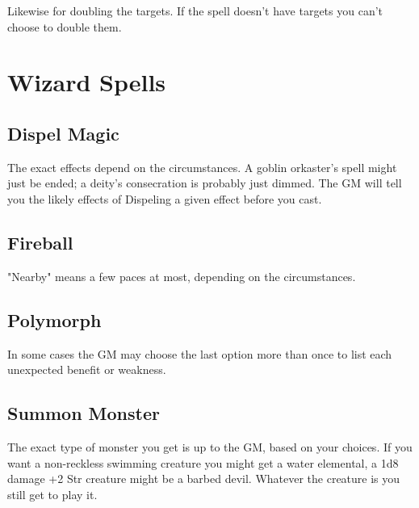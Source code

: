        

Likewise for doubling the targets. If the spell doesn't have targets you can't choose to double them.

       
\section{Wizard Spells}    
       
\subsection{Dispel Magic}    
       

The exact effects depend on the circumstances. A goblin orkaster's spell might just be ended; a deity's consecration is probably just dimmed. The GM will tell you the likely effects of Dispeling a given effect before you cast.

       
\subsection{Fireball}   
       

"Nearby" means a few paces at most, depending on the circumstances.

       
\subsection{Polymorph}   
       

In some cases the GM may choose the last option more than once to list each unexpected benefit or weakness.

       
\subsection{Summon Monster}    
       

The exact type of monster you get is up to the GM, based on your choices. If you want a non-reckless swimming creature you might get a water elemental, a 1d8 damage +2 Str creature might be a barbed devil. Whatever the creature is you still get to play it.

                
